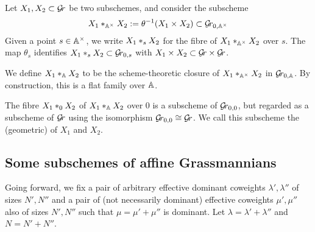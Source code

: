 \documentclass{article}
\begin{document}
Let \( X_1, X_2 \subset \Gr\) be two subschemes, and consider the subscheme 
$$ 
    X_1 \bdfamo X_2 := \theta^{-1}(X_1 \times X_2) \subset \Gr_{0, \AA^\times} 
$$
Given a point \( s \in \Ax\), we write \( X_1 \bdfamf X_2  \) for the fibre of \( X_1 \bdfamo X_2 \) over \(s\). The map \( \theta_s\) identifies \( X_1 \bdfamf X_2 \subset \Gr_{0,s}\) with \( X_1 \times X_2 \subset \Gr \times \Gr\).

We define \( X_1 \ast_{\AA} X_2 \) to be the scheme-theoretic closure of \(  X_1 \bdfamo X_2 \) in \( \Grbd \). By construction, this is a flat family over \( \AA\).

The fibre \( X_1 \geofu X_2\) of \( X_1 \ast_{\AA} X_2 \) over \(0\) is a subscheme of \( \Gr_{0,0} \), but regarded as a subscheme of \( \Gr \) using {the isomorphism} \(\Gr_{0,0} \cong \Gr \).  We call this subscheme the (geometric)  of \( X_1 \) and \( X_2\).
% 

\subsection{Some subschemes of affine Grassmannians}\label{ss:subgrs}

Going forward, we fix a pair of arbitrary effective dominant coweights $\lambda', \lambda'' $ of sizes $N',N''$ and a pair of (not necessarily dominant) effective coweights $\mu',\mu''$ also of sizes $N',N''$ such that $\mu = \mu' + \mu''$ is dominant. 
Let $ \lambda = \lambda' + \lambda'' $ and $ N = N'+N''$.
% 
\end{document}

